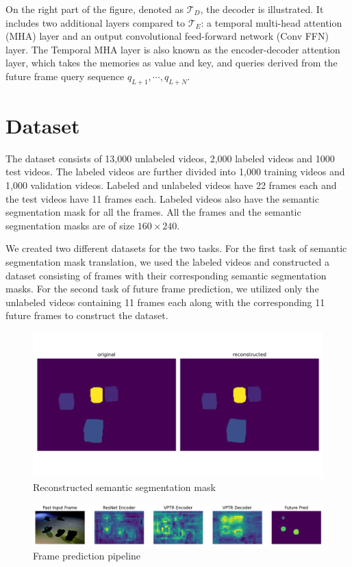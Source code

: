 \documentclass{article}
\begin{document}
On the right part of the figure, denoted as $\mathcal{T}_D$, the decoder is illustrated. It 
includes two additional layers compared to $\mathcal{T}_E$: a temporal multi-head attention 
(MHA) layer and an output convolutional feed-forward network (Conv FFN) layer. The Temporal MHA 
layer is also known as the encoder-decoder attention layer, which takes the memories as value 
and key, and queries derived from the future frame query sequence ${q_{L+1}, \cdots, q_{L+N} }$.

\section{Dataset}
The dataset consists of 13,000 unlabeled videos, 2,000 labeled videos and 1000 test videos. 
The labeled videos are further divided into 1,000 training videos and 1,000 validation videos. 
Labeled and unlabeled videos have 22 frames each and the test videos have 11 frames each.
Labeled videos also have the semantic segmentation mask for all the frames. All the frames and 
the semantic segmentation masks are of size $160 \times 240$.

We created two different datasets for the two tasks. For the first task of semantic
segmentation mask translation, we used the labeled videos and constructed a dataset consisting
of frames with their corresponding semantic segmentation masks. For the second task of future
frame prediction, we utilized only the unlabeled videos containing 11 frames each along with
the corresponding 11 future frames to construct the dataset.

\begin{figure}
  \centering
  \includegraphics[scale=0.25]{reconstructed.png}
  \caption{Reconstructed semantic segmentation mask}
  \label{fig:reconstructed}
\end{figure}

\begin{figure}
  \centering
  \includegraphics[scale=0.3]{VPTR_pipeline.png}
  \caption{Frame prediction pipeline}
  \label{fig:pipeline}
\end{figure}
\end{document}
